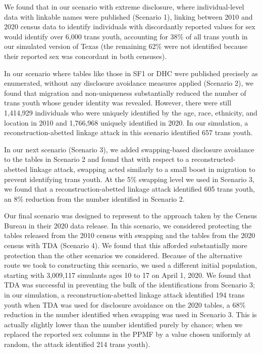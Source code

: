 \documentclass{jpc} %
\theoremstyle{plain}\newtheorem{satz}[thm]{Satz} %
\begin{document}
We found that in our scenario with extreme disclosure, where individual-level data with linkable names were published (Scenario 1), linking between 2010 and 2020 census data to identify individuals with discordantly reported values for sex would identify over 6,000 trans youth, accounting for 38\% of all trans youth in our simulated version of Texas (the remaining 62\% were not identified because their reported sex was concordant in both censuses).

In our scenario where tables like those in SF1 or DHC were published precisely as enumerated, without any disclosure avoidance measures applied (Scenario 2), we found that migration and non-uniqueness substantially reduced the number of trans youth whose gender identity was revealed.  However, there were still 1,414,929 individuals who were uniquely identified by the age, race, ethnicity, and location in 2010 and 1,766,968 uniquely identified in 2020.  In our simulation, a reconstruction-abetted linkage attack in this scenario identified 657 trans youth.

In our next scenario (Scenario 3), we added swapping-based disclosure avoidance to the tables in Scenario 2 and found that with respect to a reconstructed-abetted linkage attack, swapping acted similarly to a small boost in migration to prevent identifying trans youth.  At the 5\% swapping level we used in Scenario 3, we found that a reconstruction-abetted linkage attack identified 605 trans youth, an 8\% reduction from the number identified in Scenario 2.

Our final scenario was designed to represent to the approach taken by the Census Bureau in their 2020 data release. In this scenario, we considered protecting the tables released from the 2010 census with swapping and the tables from the 2020 census with TDA (Scenario 4).  We found that this afforded substantially more protection than the other scenarios we considered.  Because of the alternative route we took to constructing this scenario, we used a different initial population, starting with 3,009,117 simulants ages 10 to 17 on April 1, 2020.  We found that TDA was successful in preventing the bulk of the identifications from Scenario 3; in our simulation, a reconstruction-abetted linkage attack identified 194 trans youth when TDA was used for disclosure avoidance on the 2020 tables, a 68\% reduction in the number identified when swapping was used in Scenario 3.  This is actually slightly lower than the number identified purely by chance; when we replaced the reported sex columns in the PPMF by a value chosen uniformly at random, the attack identified 214 trans youth).
\end{document}

